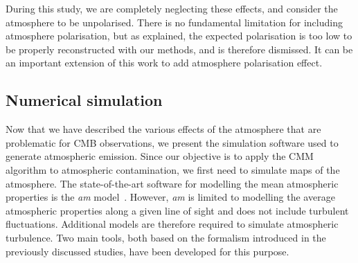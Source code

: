 \documentclass[../../thesis.tex]{subfiles}
\begin{document}
During this study, we are completely neglecting these effects, and consider the atmosphere to be unpolarised. There is no fundamental limitation for including atmosphere polarisation, but as explained, the expected polarisation is too low to be properly reconstructed with our methods, and is therefore dismissed. It can be an important extension of this work to add atmosphere polarisation effect.

\subsection{Numerical simulation}

Now that we have described the various effects of the atmosphere that are problematic for CMB observations, we present the simulation software used to generate atmospheric emission. Since our objective is to apply the CMM algorithm to atmospheric contamination, we first need to simulate maps of the atmosphere.
The state-of-the-art software for modelling the mean atmospheric properties is the \emph{am} model~\cite{paine2024}. However, \emph{am} is limited to modelling the average atmospheric properties along a given line of sight and does not include turbulent fluctuations. Additional models are therefore required to simulate atmospheric turbulence. Two main tools, both based on the formalism introduced in the previously discussed studies, have been developed for this purpose.
\end{document}
